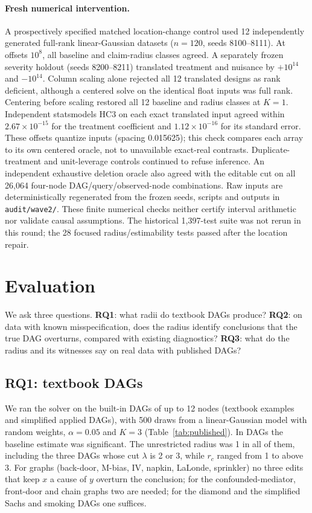 \documentclass[11pt]{article}
\begin{document}
\paragraph{Fresh numerical intervention.} A prospectively specified matched location-change control used 12 independently generated full-rank linear-Gaussian datasets ($n=120$, seeds 8100--8111). At offsets $10^8$, all baseline and claim-radius classes agreed. A separately frozen severity holdout (seeds 8200--8211) translated treatment and nuisance by $+10^{14}$ and $-10^{14}$. Column scaling alone rejected all 12 translated designs as rank deficient, although a centered solve on the identical float inputs was full rank. Centering before scaling restored all 12 baseline and radius classes at $K=1$. Independent statsmodels HC3 on each exact translated input agreed within $2.67\times10^{-15}$ for the treatment coefficient and $1.12\times10^{-16}$ for its standard error. These offsets quantize inputs (spacing 0.015625); this check compares each array to its own centered oracle, not to unavailable exact-real contrasts. Duplicate-treatment and unit-leverage controls continued to refuse inference. An independent exhaustive deletion oracle also agreed with the editable cut on all 26,064 four-node DAG/query/observed-node combinations. Raw inputs are deterministically regenerated from the frozen seeds, scripts and outputs in \texttt{audit/wave2/}. These finite numerical checks neither certify interval arithmetic nor validate causal assumptions. The historical 1,397-test suite was not rerun in this round; the 28 focused radius/estimability tests passed after the location repair.

\section{Evaluation}

We ask three questions. \textbf{RQ1}: what radii do textbook DAGs produce? \textbf{RQ2}: on data with known misspecification, does the radius identify conclusions that the true DAG overturns, compared with existing diagnostics? \textbf{RQ3}: what do the radius and its witnesses say on real data with published DAGs?

\subsection{RQ1: textbook DAGs}\label{sec:published}

We ran the solver on the \PubN{} built-in DAGs of up to 12 nodes (textbook examples and simplified applied DAGs), with 500 draws from a linear-Gaussian model with random weights, $\alpha=0.05$ and $K=3$ (Table~\ref{tab:published}). In \PubOk{} DAGs the baseline estimate was significant. The unrestricted radius was 1 in all of them, including the three DAGs whose cut $\lambda$ is 2 or 3, while $r_c$ ranged from 1 to above 3. For \PubClaimGtThree{} graphs (back-door, M-bias, IV, napkin, LaLonde, sprinkler) no three edits that keep $x$ a cause of $y$ overturn the conclusion; for the confounded-mediator, front-door and chain graphs two are needed; for the diamond and the simplified Sachs and smoking DAGs one suffices.
\end{document}
